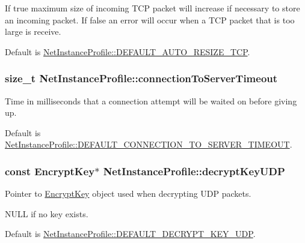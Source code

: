 If true maximum size of incoming TCP packet will increase if necessary to store an incoming packet. If false an error will occur when a TCP packet that is too large is receive. 

Default is \hyperlink{class_net_instance_profile_ae0797a8d2fdfb3f67a7b67a103a99fcb}{NetInstanceProfile::DEFAULT\_\-AUTO\_\-RESIZE\_\-TCP}. \hypertarget{class_net_instance_profile_aa9aa810da463cdab017ab864515527c9}{
\subsubsection[{connectionToServerTimeout}]{\setlength{\rightskip}{0pt plus 5cm}size\_\-t {\bf NetInstanceProfile::connectionToServerTimeout}}}
\label{class_net_instance_profile_aa9aa810da463cdab017ab864515527c9}


Time in milliseconds that a connection attempt will be waited on before giving up. 

Default is \hyperlink{class_net_instance_profile_a650e1a57d7229fab6a4a9295a8145f79}{NetInstanceProfile::DEFAULT\_\-CONNECTION\_\-TO\_\-SERVER\_\-TIMEOUT}. \hypertarget{class_net_instance_profile_a0909a6a77030a97700cef25384df37b0}{
\subsubsection[{decryptKeyUDP}]{\setlength{\rightskip}{0pt plus 5cm}const {\bf EncryptKey}$\ast$ {\bf NetInstanceProfile::decryptKeyUDP}}}
\label{class_net_instance_profile_a0909a6a77030a97700cef25384df37b0}


Pointer to \hyperlink{class_encrypt_key}{EncryptKey} object used when decrypting UDP packets. 

NULL if no key exists. \par
\par


Default is \hyperlink{class_net_instance_profile_a3468dd5fa20f1c13888bf1d6eed1736a}{NetInstanceProfile::DEFAULT\_\-DECRYPT\_\-KEY\_\-UDP}. \par
\par


